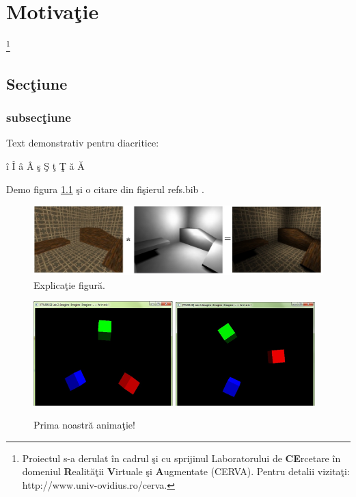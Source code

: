 \chapter{Motiva\c tie}\footnote{Proiectul s-a derulat \^ in cadrul \c si cu sprijinul Laboratorului de \textbf{CE}rcetare \^ in domeniul \textbf{R}ealit\u a\c tii \textbf{V}irtuale \c si \textbf{A}ugmentate (CERVA). Pentru detalii vizita\c ti: http://www.univ-ovidius.ro/cerva.}

\section{Sec\c tiune}
\subsection{subsec\c tiune}

Text demonstrativ pentru diacritice:

\^ i \^ I \^ a \^ A \c s \c S \c t \c T \u a \u A 

Demo figura \ref{fig:demo1} \c si o citare din fi\c sierul refs.bib \cite{albeanu05}.

\begin{figure}[htbp]
	\centering
		\includegraphics[scale=0.40]{all.jpg}
	\caption{Explica\c tie figur\u a.}

\label{fig:demo1}
\end{figure}

\begin{figure}[htbp]
	\centering
		\includegraphics[width=0.48\textwidth]{l2f1a.png}
		\includegraphics[width=0.48\textwidth]{l2f1b.png}
	\caption{Prima noastr\u a anima\c tie!}
	\label{fig:l2f1}
\end{figure}

